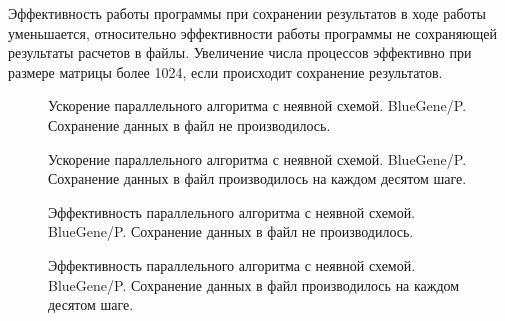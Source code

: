 Эффективность работы программы при сохранении результатов в ходе работы уменьшается, относительно эффективности работы программы не сохраняющей результаты расчетов в файлы. Увеличение числа процессов эффективно при размере матрицы более 1024, если происходит сохранение результатов.
	\begin{figure}[h!]
		\begin{center}
			\begin{minipage}{0.45\linewidth}
                \caption{Ускорение параллельного алгоритма с неявной схемой. BlueGene/P. Сохранение данных в файл не производилось.}
                \label{gr:SweepSpeedupBluegeneNosave}
			\end{minipage}
			\hfill
			\begin{minipage}{0.45\linewidth}
                \caption{Ускорение параллельного алгоритма с неявной схемой. BlueGene/P. Сохранение данных в файл производилось на каждом десятом шаге.}
                \label{gr:SweepSpeedupBluegeneSave}
			\end{minipage}
		\end{center}
	\end{figure}
    \begin{figure}[h!]
        \begin{center}
            \begin{minipage}{0.45\linewidth}
                \caption{Эффективность параллельного алгоритма с неявной схемой. BlueGene/P. Сохранение данных в файл не производилось.}
                \label{gr:SweepEfficiencyBluegeneNosave}
            \end{minipage}
            \hfill
            \begin{minipage}{0.45\linewidth}
                \caption{Эффективность параллельного алгоритма с неявной схемой. BlueGene/P. Сохранение данных в файл производилось на каждом десятом шаге.}
                \label{gr:SweepEfficiencyBluegeneSave}
            \end{minipage}
        \end{center}
    \end{figure}
    
